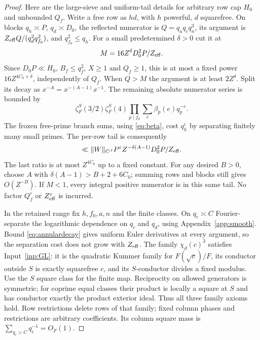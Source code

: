 \documentclass[11pt,a4paper]{article}
\numberwithin{equation}{section}
\theoremstyle{definition}
\theoremstyle{remark}
\newcommand{\eps}{\varepsilon}
\begin{document}
\begin{proof}
Here are the large-sieve and uniform-tail details for arbitrary row cap $H_0$ and unbounded $Q_f$. Write a free row as $hd$, with $h$ powerful, $d$ squarefree. On blocks $q_h\asymp P$, $q_d\asymp D_0$, the reflected numerator is $Q=q_aq_cq_n^3$, its argument is $Z_{\rm eff}Q/(q_d^2q_{f_0}^2)$, and $q_{f_0}^2\le q_h$. For a small predetermined $\delta>0$ cut it at
\begin{equation}\label{eq:uniformcut}
 M=16Z^\delta D_0^2P/Z_{\rm eff}.
\end{equation}
Since $D_0P\ll H_0$, $B_f\le q_f^2$, $X\ge1$ and $Q_f\ge1$, this is at most a fixed power $16Z^{4C_0+\delta}$, independently of $Q_f$. When $Q>M$ the argument is at least $2Z^\delta$. Split its decay as $x^{-A}=x^{-(A-1)}x^{-1}$. The remaining absolute numerator series is bounded by
\[
 \zeta_F^S(3/2)\zeta_F^S(4)
        \prod_{p\mid f_0}\sum_e\beta_p(e)q_p^{-e}.
\]
The frozen free-prime branch sums, using \eqref{eq:beta}, cost $q_h^\eps$ by separating finitely many small primes. The per-row tail is consequently
\[
 \ll\|W\|_{C^J}P^\eps Z^{-\delta(A-1)}
                         D_0^2P/Z_{\rm eff}.
\]
The last ratio is at most $Z^{4C_0}$ up to a fixed constant. For any desired $B>0$, choose $A$ with
$\delta(A-1)>B+2+6C_0$; summing rows and blocks still gives $O(Z^{-B})$. If $M<1$, every integral positive numerator is in this same tail. No factor $Q_f^\eps$ or $Z_{\rm eff}^\eps$ is incurred.

In the retained range fix $h,f_0,a,n$ and the finite classes. On $q_c\asymp C$ Fourier-separate the logarithmic dependence on $q_c$ and $q_d$, using Appendix~\ref{app:smooth}. Bound \eqref{eq:annulardecay} gives uniform Euler derivatives at every argument, so the separation cost does not grow with $Z_{\rm eff}$. The family $\chi_d(c)^3$ satisfies Input~\ref{inp:GL}: it is the quadratic Kummer family for $F(\sqrt c)/F$, its conductor outside $S$ is exactly squarefree $c$, and its $S$-conductor divides a fixed modulus. Use the $S$ square class for the finite map. Reciprocity on allowed generators is symmetric; for coprime equal classes their product is locally a square at $S$ and has conductor exactly the product exterior ideal. Thus all three family axioms hold. Row restrictions delete rows of that family; fixed column phases and restrictions are arbitrary coefficients. Its column square mass is
$\sum_{q_c\asymp C}q_c^{-1}=O_F(1)$.


\end{proof}
\end{document}
